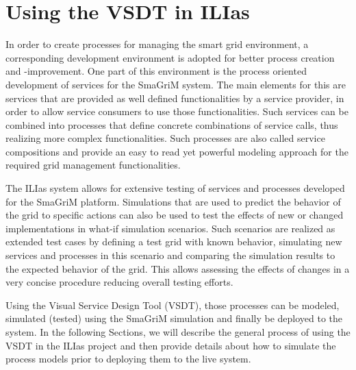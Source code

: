 \chapter{Using the VSDT in ILIas}





In order to create processes for managing the smart grid environment, a
corresponding development environment is adopted for better process creation and
-improvement.  One part of this environment is the process oriented development
of services for the SmaGriM system.  The main elements for this are services that
are provided as well defined functionalities by a service provider, in order to
allow service consumers to use those functionalities.  Such services can be
combined into processes that define concrete combinations of service calls, thus
realizing more complex functionalities.  Such processes are also called service
compositions and provide an easy to read yet powerful modeling approach for the
required grid management functionalities.

The ILIas system allows for extensive testing of services and processes developed
for the SmaGriM platform.  Simulations that are used to predict the behavior of
the grid to specific actions can also be used to test the effects of new or changed
implementations in what-if simulation scenarios.  Such scenarios are realized as
extended test cases by defining a test grid with known behavior, simulating new
services and processes in this scenario and comparing the simulation results to
the expected behavior of the grid.  This allows assessing the effects of changes
in a very concise procedure reducing overall testing efforts.

Using the Visual Service Design Tool (VSDT), those processes can be modeled,
simulated (tested) using the SmaGriM simulation and finally be deployed to the
system.  In the following Sections, we will describe the general process of using
the VSDT in the ILIas project and then provide details about how to simulate the
process models prior to deploying them to the live system.



